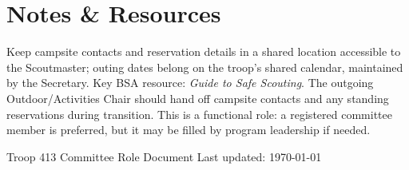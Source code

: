 \documentclass[11pt, letterpaper]{article}
\begin{document}
\vspace{0.6em}

\section{Notes \& Resources}
Keep campsite contacts and reservation details in a shared location accessible to the Scoutmaster; outing dates belong on the troop's shared calendar, maintained by the Secretary. Key BSA resource: \textit{Guide to Safe Scouting}. The outgoing Outdoor/Activities Chair should hand off campsite contacts and any standing reservations during transition. This is a functional role: a registered committee member is preferred, but it may be filled by program leadership if needed.

\vfill
\begin{center}
  \footnotesize\color{gray}
  Troop 413 \textbullet{} Committee Role Document \textbullet{} Last updated: \today
\end{center}
\end{document}
